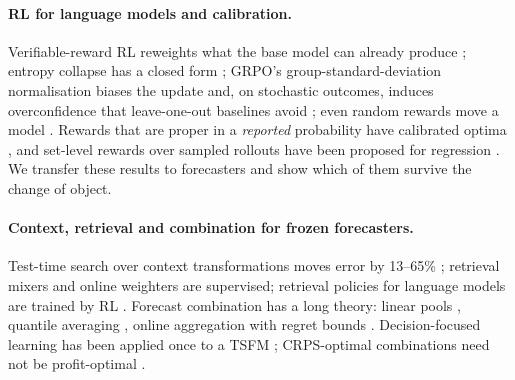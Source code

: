 \documentclass{article}
\begin{document}
\paragraph{RL for language models and calibration.} Verifiable-reward RL \citep{deepseek2025r1,lambert2024tulu3} reweights what the base model can already produce \citep{yue2025does}; entropy collapse has a closed form \citep{cui2025entropy}; GRPO's group-standard-deviation normalisation biases the update \citep{liu2025drgrpo} and, on stochastic outcomes, induces overconfidence that leave-one-out baselines avoid \citep{turtel2025outcome,bereket2025uncalibrated,ahmadian2024rloo}; even random rewards move a model \citep{shao2025spurious}. Rewards that are proper in a \emph{reported} probability have calibrated optima \citep{damani2025rlcr}, and set-level rewards over sampled rollouts have been proposed for regression \citep{park2026distaware}. We transfer these results to forecasters and show which of them survive the change of object.

\paragraph{Context, retrieval and combination for frozen forecasters.} Test-time search over context transformations moves error by 13--65\% \citep{qiu2026tato}; retrieval mixers \citep{ning2025tsrag} and online weighters \citep{lee2025elf,das2025synapse} are supervised; retrieval policies for language models are trained by RL \citep{hsu2024leret,jin2025searchr1}. Forecast combination has a long theory: linear pools \citep{ranjan2010combining}, quantile averaging \citep{lichtendahl2013quantile}, online aggregation with regret bounds \citep{cesabianchi2006prediction,berrisch2021crps}. Decision-focused learning \citep{elmachtoub2022smart} has been applied once to a TSFM \citep{beichter2025dfl}; CRPS-optimal combinations need not be profit-optimal \citep{nitka2023combining}.
\end{document}
